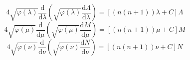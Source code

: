 \documentclass[a4paper]{ctexart}
\begin{document}
\begin{equation}
    4\sqrt{\varphi \left( \lambda \right)}\frac{\text{d}}{\text{d}\lambda}\left( \sqrt{\varphi \left( \lambda \right)}\frac{\text{d}\Lambda}{\text{d}\lambda} \right) =\left[ \left( n\left( n+1 \right) \right) \lambda +C \right] \Lambda
\end{equation}
\begin{equation}
    4\sqrt{\varphi \left( \mu \right)}\frac{\text{d}}{\text{d}\mu}\left( \sqrt{\varphi \left( \mu \right)}\frac{\text{d}M}{\text{d}\mu} \right) =\left[ \left( n\left( n+1 \right) \right) \mu +C \right] M
\end{equation}
\begin{equation}
    4\sqrt{\varphi \left( \nu \right)}\frac{\text{d}}{\text{d}\nu}\left( \sqrt{\varphi \left( \nu \right)}\frac{\text{d}N}{\text{d}\nu} \right) =\left[ \left( n\left( n+1 \right) \right) \nu +C \right] N
\end{equation}
\end{document}
